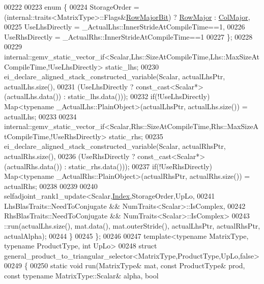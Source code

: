 \begin{DoxyCode}
00222 
00223     \textcolor{keyword}{enum} \{
00224       StorageOrder = (internal::traits<MatrixType>::Flags&\hyperlink{group__flags_gae4f56c2a60bbe4bd2e44c5b19cbe8762}{RowMajorBit}) ? 
      \hyperlink{group__enums_ggaacded1a18ae58b0f554751f6cdf9eb13acfcde9cd8677c5f7caf6bd603666aae3}{RowMajor} : \hyperlink{group__enums_ggaacded1a18ae58b0f554751f6cdf9eb13a0cbd4bdd0abcfc0224c5fcb5e4f6669a}{ColMajor},
00225       UseLhsDirectly = \_ActualLhs::InnerStrideAtCompileTime==1,
00226       UseRhsDirectly = \_ActualRhs::InnerStrideAtCompileTime==1
00227     \};
00228     
00229     
      internal::gemv\_static\_vector\_if<Scalar,Lhs::SizeAtCompileTime,Lhs::MaxSizeAtCompileTime,!UseLhsDirectly> static\_lhs;
00230     ei\_declare\_aligned\_stack\_constructed\_variable(Scalar, actualLhsPtr, actualLhs.size(),
00231       (UseLhsDirectly ? \textcolor{keyword}{const\_cast<}Scalar*\textcolor{keyword}{>}(actualLhs.data()) : static\_lhs.data()));
00232     \textcolor{keywordflow}{if}(!UseLhsDirectly) Map<typename \_ActualLhs::PlainObject>(actualLhsPtr, actualLhs.size()) = actualLhs;
00233     
00234     
      internal::gemv\_static\_vector\_if<Scalar,Rhs::SizeAtCompileTime,Rhs::MaxSizeAtCompileTime,!UseRhsDirectly> static\_rhs;
00235     ei\_declare\_aligned\_stack\_constructed\_variable(Scalar, actualRhsPtr, actualRhs.size(),
00236       (UseRhsDirectly ? \textcolor{keyword}{const\_cast<}Scalar*\textcolor{keyword}{>}(actualRhs.data()) : static\_rhs.data()));
00237     \textcolor{keywordflow}{if}(!UseRhsDirectly) Map<typename \_ActualRhs::PlainObject>(actualRhsPtr, actualRhs.size()) = actualRhs;
00238     
00239     
00240     selfadjoint\_rank1\_update<Scalar,\hyperlink{namespace_eigen_a62e77e0933482dafde8fe197d9a2cfde}{Index},StorageOrder,UpLo,
00241                               LhsBlasTraits::NeedToConjugate && NumTraits<Scalar>::IsComplex,
00242                               RhsBlasTraits::NeedToConjugate && NumTraits<Scalar>::IsComplex>
00243           ::run(actualLhs.size(), mat.data(), mat.outerStride(), actualLhsPtr, actualRhsPtr, actualAlpha);
00244   \}
00245 \};
00246 
00247 \textcolor{keyword}{template}<\textcolor{keyword}{typename} MatrixType, \textcolor{keyword}{typename} ProductType, \textcolor{keywordtype}{int} UpLo>
00248 \textcolor{keyword}{struct }general\_product\_to\_triangular\_selector<MatrixType,ProductType,UpLo,false>
00249 \{
00250   \textcolor{keyword}{static} \textcolor{keywordtype}{void} run(MatrixType& mat, \textcolor{keyword}{const} ProductType& prod, \textcolor{keyword}{const} \textcolor{keyword}{typename} MatrixType::Scalar& alpha, \textcolor{keywordtype}{bool} 

\end{DoxyCode}
